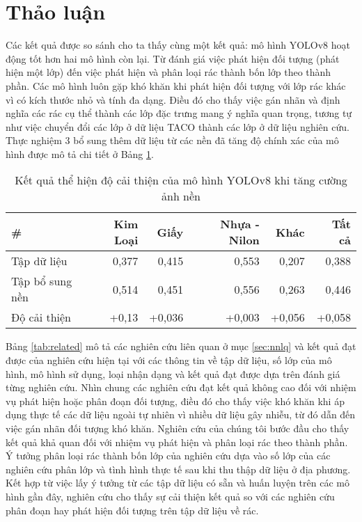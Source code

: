\documentclass[../the.tex]{subfiles}
\begin{document}
\section{Thảo luận}
 {\fontsize{13}{12} \selectfont

  Các kết quả được so sánh cho ta thấy cùng một kết quả: mô hình YOLOv8 hoạt động tốt hơn hai mô hình còn lại.
  Từ đánh giá việc phát hiện đối tượng (phát hiện một lớp) đến việc phát hiện và phân loại rác thành bốn lớp theo thành phần.
  Các mô hình luôn gặp khó khăn khi phát hiện đối tượng với lớp rác khác vì có kích thước nhỏ và tính đa dạng.
  Điều đó cho thấy việc gán nhãn và định nghĩa các rác cụ thể thành các lớp đặc trưng mang ý nghĩa quan trọng,
  tương tự như việc chuyển đổi các lớp ở dữ liệu TACO thành các lớp ở dữ liệu nghiên cứu.
  Thực nghiệm 3 bổ sung thêm dữ liệu từ các nền đã tăng độ chính xác của mô hình được mô tả chi tiết ở Bảng \ref{tab:thaoluan1}.

 }


\begin{table}[h!]
    \centering
    \caption{Kết quả thể hiện độ cải thiện của mô hình YOLOv8 khi tăng cường ảnh nền}
    \begin{tabular}{|l|r|r|r|r|r|}
        \hline
        \multicolumn{1}{|l|}{\textbf{\#}} & \textbf{Kim Loại} & \textbf{Giấy} & \textbf{Nhựa - Nilon} & \textbf{Khác} & \textbf{Tất cả} \\ \hline
        Tập dữ liệu                       & 0,377             & 0,415         & 0,553                 & 0,207         & 0,388           \\ \hline
        Tập bổ sung nền                 & 0,514             & 0,451         & 0,556                 & 0,263         & 0,446           \\ \hline
        Độ cải thiện                      & +0,13             & +0,036        & +0,003                & +0,056        & +0,058          \\ \hline
    \end{tabular}
    \label{tab:thaoluan1}
\end{table}


{\fontsize{13}{12} \selectfont

Bảng \ref{tab:related}
mô tả các nghiên cứu liên quan ở mục \ref{sec:nnlq} và kết quả đạt được của nghiên cứu hiện tại với các thông tin về tập dữ liệu, số lớp của mô hình, mô hình sử dụng, loại nhận dạng và kết quả đạt được dựa trên đánh giá từng nghiên cứu.
Nhìn chung các nghiên cứu đạt kết quả không cao đối với nhiệm vụ phát hiện hoặc phân đoạn đối tượng, điều đó cho thấy việc khó khăn khi áp dụng thực tế các dữ liệu ngoài tự nhiên vì nhiều dữ liệu gây nhiễu,
từ đó dẫn đến việc gán nhãn đối tượng khó khăn.
Nghiên cứu của chúng tôi bước đầu cho thấy kết quả khả quan đối với nhiệm vụ phát hiện và phân loại rác theo thành phần.
Ý tưởng phân loại rác thành bốn lớp của nghiên cứu dựa vào số lớp của các nghiên cứu phân lớp và tình hình thực tế sau khi thu thập dữ liệu ở địa phương. Kết hợp từ việc lấy ý tưởng từ các tập dữ liệu có sẵn và huấn luyện trên các mô hình gần đây,
nghiên cứu cho thấy sự cải thiện kết quả so với các nghiên cứu phân đoạn hay phát hiện đối tượng trên tập dữ liệu về rác.

}
\end{document}
